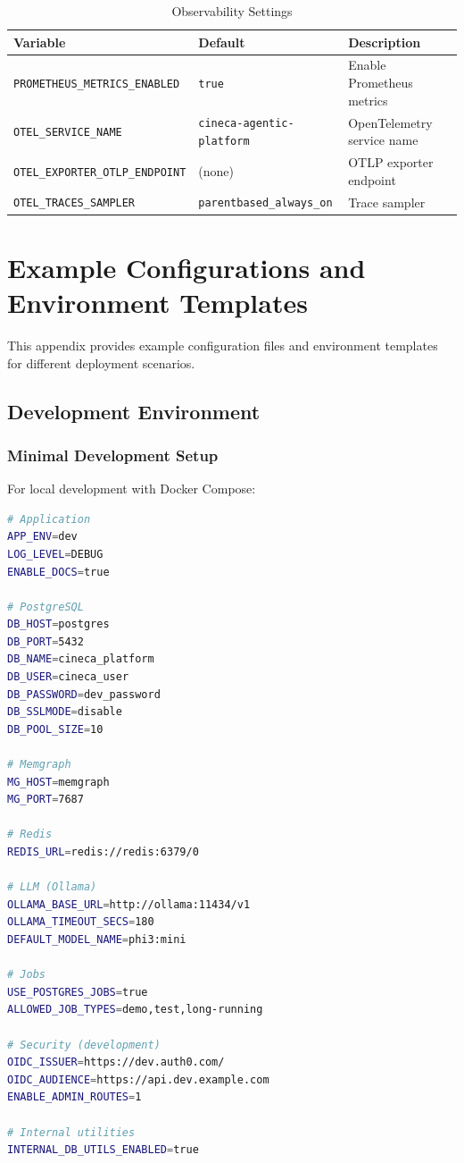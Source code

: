 \documentclass[a4paper,twoside]{sapthesis}
\begin{document}
\begin{table}[ht]
\centering
\caption{Observability Settings}
\label{tab:config-observability}
\small
\begin{tabularx}{\textwidth}{llX}
    \hline
    \textbf{Variable} & \textbf{Default} & \textbf{Description} \\
    \hline
    \texttt{PROMETHEUS\_METRICS\_ENABLED} & \texttt{true} & Enable Prometheus metrics \\
    \texttt{OTEL\_SERVICE\_NAME} & \texttt{cineca-agentic-platform} & OpenTelemetry service name \\
    \texttt{OTEL\_EXPORTER\_OTLP\_ENDPOINT} & (none) & OTLP exporter endpoint \\
    \texttt{OTEL\_TRACES\_SAMPLER} & \texttt{parentbased\_always\_on} & Trace sampler \\
    \hline
\end{tabularx}
\end{table}


\chapter{Example Configurations and Environment Templates}
\label{app:example-configs}

This appendix provides example configuration files and environment templates for different deployment scenarios.

\section{Development Environment}
\label{app:config:dev}

\subsection{Minimal Development Setup}

For local development with Docker Compose:

\begin{lstlisting}[language=bash,caption={.env.development}]
# Application
APP_ENV=dev
LOG_LEVEL=DEBUG
ENABLE_DOCS=true

# PostgreSQL
DB_HOST=postgres
DB_PORT=5432
DB_NAME=cineca_platform
DB_USER=cineca_user
DB_PASSWORD=dev_password
DB_SSLMODE=disable
DB_POOL_SIZE=10

# Memgraph
MG_HOST=memgraph
MG_PORT=7687

# Redis
REDIS_URL=redis://redis:6379/0

# LLM (Ollama)
OLLAMA_BASE_URL=http://ollama:11434/v1
OLLAMA_TIMEOUT_SECS=180
DEFAULT_MODEL_NAME=phi3:mini

# Jobs
USE_POSTGRES_JOBS=true
ALLOWED_JOB_TYPES=demo,test,long-running

# Security (development)
OIDC_ISSUER=https://dev.auth0.com/
OIDC_AUDIENCE=https://api.dev.example.com
ENABLE_ADMIN_ROUTES=1

# Internal utilities
INTERNAL_DB_UTILS_ENABLED=true
\end{lstlisting}
\end{document}
